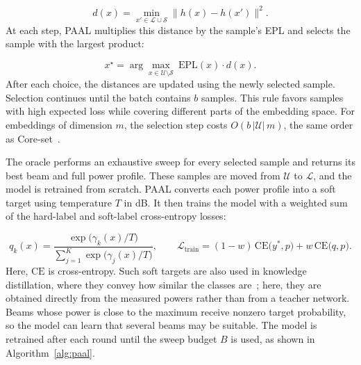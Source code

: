 \documentclass[journal,onecolumn]{IEEEtran}
\begin{document}
\begin{equation}
  d(x) = \min_{x' \in \mathcal{L} \cup \mathcal{S}} \big\| h(x) - h(x') \big\|^{2}.
  \label{eq:dist}
\end{equation}
At each step, PAAL multiplies this distance by the sample's EPL and selects the sample with the largest product:

\begin{equation}
  x^{\star} = \arg\max_{x \in \mathcal{U} \setminus \mathcal{S}} \ \mathrm{EPL}(x) \cdot d(x).
  \label{eq:kcenter}
\end{equation}
After each choice, the distances are updated using the newly selected sample. Selection continues until the batch contains $b$ samples. This rule favors samples with high expected loss while covering different parts of the embedding space. For embeddings of dimension $m$, the selection step costs $O(b\,|\mathcal{U}|\,m)$, the same order as Core-set~\cite{sener2018coreset}.

The oracle performs an exhaustive sweep for every selected sample and returns its best beam and full power profile. These samples are moved from $\mathcal{U}$ to $\mathcal{L}$, and the model is retrained from scratch. PAAL converts each power profile into a soft target using temperature $T$ in dB. It then trains the model with a weighted sum of the hard-label and soft-label cross-entropy losses:

\begin{equation}
  q_k(x) = \frac{\exp\big(\gamma_k(x)/T\big)}{\sum_{j=1}^{K} \exp\big(\gamma_j(x)/T\big)},
  \qquad
  \mathcal{L}_{\text{train}} = (1-w)\,\mathrm{CE}\big(y^{*}, p\big) + w\,\mathrm{CE}\big(q, p\big).
  \label{eq:train}
\end{equation}
Here, $\mathrm{CE}$ is cross-entropy. Such soft targets are also used in knowledge distillation, where they convey how similar the classes are~\cite{hinton2015distilling}; here, they are obtained directly from the measured powers rather than from a teacher network. Beams whose power is close to the maximum receive nonzero target probability, so the model can learn that several beams may be suitable. The model is retrained after each round until the sweep budget $B$ is used, as shown in Algorithm~\ref{alg:paal}.
\end{document}
